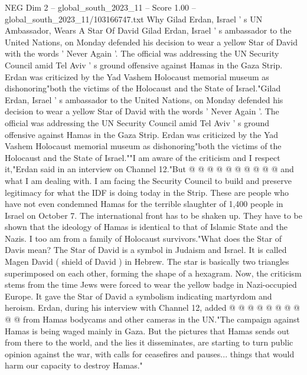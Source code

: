 \begin{textsample}{NEG Dim 2 – global\_south\_2023\_11 – Score 1.00 – global\_south\_2023\_11/103166747.txt}  \label{ex:f2_neg_351}
Why Gilad Erdan, Israel ' s UN Ambassador, Wears A Star Of David Gilad Erdan, Israel ' s ambassador to the United Nations, on Monday defended his decision to wear a yellow Star of David with the words ' Never Again '.
The official was addressing the UN Security Council amid Tel Aviv ' s ground offensive against Hamas in the Gaza Strip.
Erdan was criticized by the Yad Vashem Holocaust memorial museum as dishonoring"both the victims of the Holocaust and the State of Israel."Gilad Erdan, Israel ' s ambassador to the United Nations, on Monday defended his decision to wear a yellow Star of David with the words ' Never Again '.
The official was addressing the UN Security Council amid Tel Aviv ' s ground offensive against Hamas in the Gaza Strip.
Erdan was criticized by the Yad Vashem Holocaust memorial museum as dishonoring"both the victims of the Holocaust and the State of Israel.""I am aware of the criticism and I respect it,"Erdan said in an interview on Channel 12."But @ @ @ @ @ @ @ @ @ @ and what I am dealing with.
I am facing the Security Council to build and preserve legitimacy for what the IDF is doing today in the Strip.
These are people who have not even condemned Hamas for the terrible slaughter of 1,400 people in Israel on October 7.
The international front has to be shaken up.
They have to be shown that the ideology of Hamas is identical to that of Islamic State and the Nazis.
I too am from a family of Holocaust survivors."What does the Star of Davis mean?
The Star of David is a symbol in Judaism and Israel.
It is called Magen David ( shield of David ) in Hebrew.
The star is basically two triangles superimposed on each other, forming the shape of a hexagram.
Now, the criticism stems from the time Jews were forced to wear the yellow badge in Nazi-occupied Europe.
It gave the Star of David a symbolism indicating martyrdom and heroism.
Erdan, during his interview with Channel 12, added @ @ @ @ @ @ @ @ @ @ from Hamas bodycams and other cameras in the UN."The campaign against Hamas is being waged mainly in Gaza.
But the pictures that Hamas sends out from there to the world, and the lies it disseminates, are starting to turn public opinion against the war, with calls for ceasefires and pauses... things that would harm our capacity to destroy Hamas."

\end{textsample}

